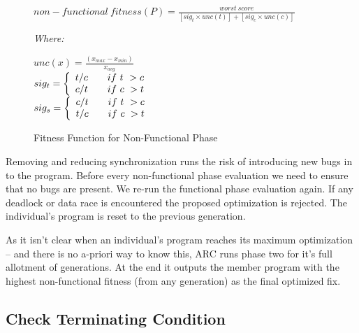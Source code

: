 \documentclass[10pt, conference, compsocconf]{IEEEtran}
\begin{document}
\begin{figure}
\begin{footnotesize}
\begin{center}
$non-functional\ fitness(P) = \frac{worst\ score}{[sig_t \times unc(t)] + [sig_c \times unc(c)]}$
\end{center}
\vspace{0.1cm} \textit{Where:} \vspace{0.1cm}
\end{footnotesize}
\begin{tiny}
\begin{center}
$unc(x) = \frac{(x_{max} - x_{min})}{x_{avg}}$ \\ \vspace{0.2cm}
$
  sig_t = \left\{
  \begin{array}{l l}
    t/c & \quad if\ t\ > c \\
    c/t & \quad if\ c\ > t \\
  \end{array} \right.
$ \\ \vspace{0.2cm}
$
  sig_s = \left\{
  \begin{array}{l l}
    c/t & \quad if\ t\ > c \\
    t/c & \quad if\ c\ > t \\
  \end{array} \right.
$ \\
\end{center}
\end{tiny}
\caption{Fitness Function for Non-Functional Phase}
\label{fig:nonfunctional_fitness}
\end{figure}

Removing and reducing synchronization runs the risk of introducing new bugs in
to the program. Before every non-functional phase evaluation we need to ensure
that no bugs are present. We re-run the functional phase evaluation again.
If any deadlock or data race is encountered the proposed optimization is
rejected. The individual's program is reset to the previous generation.

As it isn't clear when an individual's program reaches its maximum optimization
-- and there is no a-priori way to know this, ARC runs phase two for
it's full allotment of generations.  At the end it outputs the member program
with the highest non-functional fitness (from any generation) as the final
optimized fix.

\subsection{Check Terminating Condition}
\label{sec:check_terminating_condition}
\end{document}
